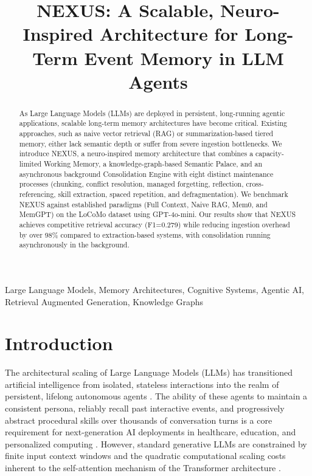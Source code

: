 \documentclass[conference]{IEEEtran}
\begin{document}
\title{NEXUS: A Scalable, Neuro-Inspired Architecture for Long-Term Event Memory in LLM Agents}

\author{
}

\maketitle

\begin{abstract}
As Large Language Models (LLMs) are deployed in persistent, long-running agentic applications, scalable long-term memory architectures have become critical. Existing approaches, such as naive vector retrieval (RAG) or summarization-based tiered memory, either lack semantic depth or suffer from severe ingestion bottlenecks. We introduce NEXUS, a neuro-inspired memory architecture that combines a capacity-limited Working Memory, a knowledge-graph-based Semantic Palace, and an asynchronous background Consolidation Engine with eight distinct maintenance processes (chunking, conflict resolution, managed forgetting, reflection, cross-referencing, skill extraction, spaced repetition, and defragmentation). We benchmark NEXUS against established paradigms (Full Context, Naive RAG, Mem0, and MemGPT) on the LoCoMo dataset using GPT-4o-mini. Our results show that NEXUS achieves competitive retrieval accuracy (F1=0.279) while reducing ingestion overhead by over 98\% compared to extraction-based systems, with consolidation running asynchronously in the background.
\end{abstract}

\begin{IEEEkeywords}
Large Language Models, Memory Architectures, Cognitive Systems, Agentic AI, Retrieval Augmented Generation, Knowledge Graphs
\end{IEEEkeywords}

\section{Introduction}

The architectural scaling of Large Language Models (LLMs) has transitioned artificial intelligence from isolated, stateless interactions into the realm of persistent, lifelong autonomous agents \cite{brown2020language, xi2023rise}. The ability of these agents to maintain a consistent persona, reliably recall past interactive events, and progressively abstract procedural skills over thousands of conversation turns is a core requirement for next-generation AI deployments in healthcare, education, and personalized computing \cite{wang2023survey}. However, standard generative LLMs are constrained by finite input context windows and the quadratic computational scaling costs inherent to the self-attention mechanism of the Transformer architecture \cite{vaswani2017attention}.
\end{document}
